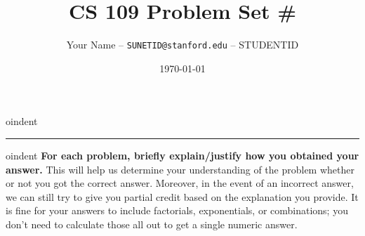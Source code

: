 \documentclass[12pt]{article}
\title{CS 109 Problem Set \#}
\author{Your Name -- \texttt{SUNETID@stanford.edu} -- STUDENTID}
\date{\today}
\begin{document}
  \maketitle

  \vspace{-0.3in}
  
oindent
  \rule{\linewidth}{0.4pt}

  
oindent
  \textbf{For each problem, briefly explain/justify how you
  obtained your answer.} This will help us determine your understanding of
  the problem whether or not you got the correct answer. Moreover, in the
  event of an incorrect answer, we can still try to give you partial credit
  based on the explanation you provide. It is fine for your answers to include
  factorials, exponentials, or combinations; you don't need to calculate those
  all out to get a single numeric answer.


\end{document}
